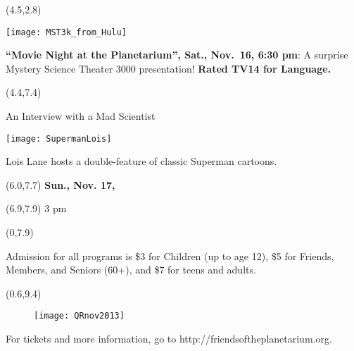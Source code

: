 \documentclass{article}
\begin{document}
\begin{textblock}{3.2}(4.5,2.8)

   \texttt{[image: MST3k\_from\_Hulu]}

   {\fontsize{16}{17}
   \textbf{“Movie Night at the Planetarium”, Sat., Nov.~16, 6:30 pm}:
    A surprise Mystery Science Theater 3000 presentation! 
    \textbf{Ra\-ted TV14 for Language.}

    }

\end{textblock}

\begin{textblock}{3.3}(4.4,7.4)
   {\fontsize{16}{17}

   An Interview with a Mad Scientist 

   \texttt{[image: SupermanLois]}

   Lois Lane hosts a double-feature of classic Superman cartoons. 

   }
\end{textblock}

   {\fontsize{16}{17}

\begin{textblock}{1.2}(6.0,7.7)
   \textbf{Sun., Nov. 17,}
\end{textblock}
\begin{textblock}{2}(6.9,7.9)
   3 pm
\end{textblock}

   }


\begin{textblock}{3.6}(0,7.9)
   {\fontsize{16}{17}

Admission for all programs is \$3 for Children (up to age 12), \$5 for Friends, Members, and Seniors (60+), and \$7 for teens and adults.

   }
\end{textblock}

\begin{textblock}{3}(0.6,9.4)

   {\fontsize{18}{19}
\begin{wrapfigure}{l}{0.7in}
   \texttt{[image: QRnov2013]}
\end{wrapfigure}      

For tickets and more information, go to http://friendsoftheplanetarium.org.

}
\end{textblock}
\end{document}
